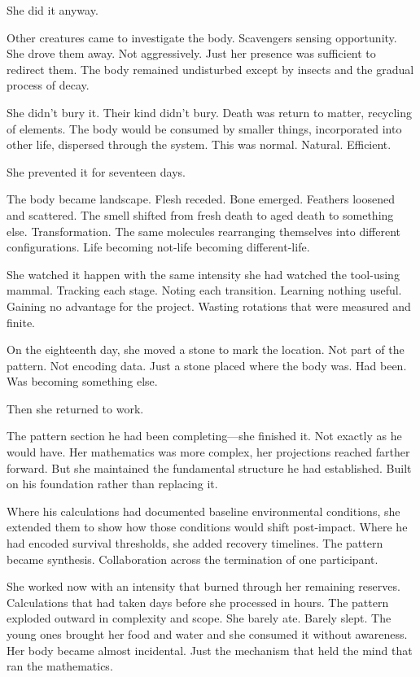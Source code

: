 She did it anyway.

Other creatures came to investigate the body. Scavengers sensing opportunity. She drove them away. Not aggressively. Just her presence was sufficient to redirect them. The body remained undisturbed except by insects and the gradual process of decay.

She didn't bury it. Their kind didn't bury. Death was return to matter, recycling of elements. The body would be consumed by smaller things, incorporated into other life, dispersed through the system. This was normal. Natural. Efficient.

She prevented it for seventeen days.

The body became landscape. Flesh receded. Bone emerged. Feathers loosened and scattered. The smell shifted from fresh death to aged death to something else. Transformation. The same molecules rearranging themselves into different configurations. Life becoming not-life becoming different-life.

She watched it happen with the same intensity she had watched the tool-using mammal. Tracking each stage. Noting each transition. Learning nothing useful. Gaining no advantage for the project. Wasting rotations that were measured and finite.

On the eighteenth day, she moved a stone to mark the location. Not part of the pattern. Not encoding data. Just a stone placed where the body was. Had been. Was becoming something else.

Then she returned to work.

The pattern section he had been completing—she finished it. Not exactly as he would have. Her mathematics was more complex, her projections reached farther forward. But she maintained the fundamental structure he had established. Built on his foundation rather than replacing it.

Where his calculations had documented baseline environmental conditions, she extended them to show how those conditions would shift post-impact. Where he had encoded survival thresholds, she added recovery timelines. The pattern became synthesis. Collaboration across the termination of one participant.

She worked now with an intensity that burned through her remaining reserves. Calculations that had taken days before she processed in hours. The pattern exploded outward in complexity and scope. She barely ate. Barely slept. The young ones brought her food and water and she consumed it without awareness. Her body became almost incidental. Just the mechanism that held the mind that ran the mathematics.

